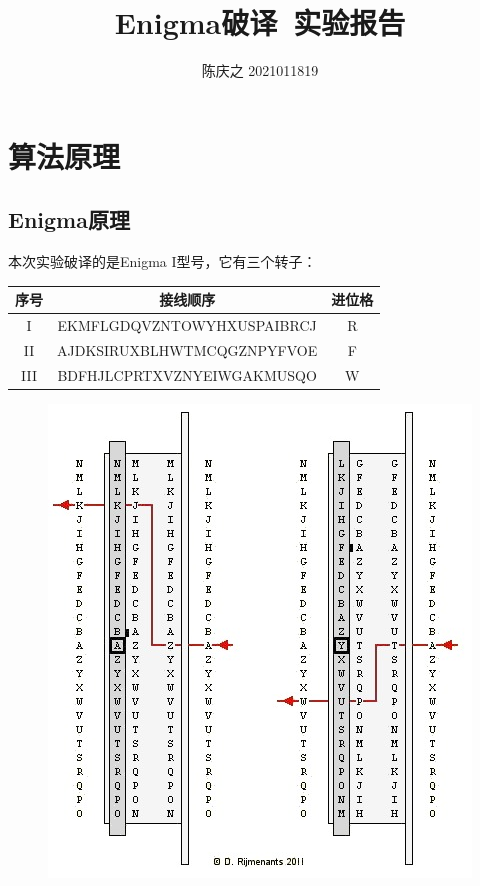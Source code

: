 \documentclass[a4paper,12pt]{article}
\title{Enigma破译\ 实验报告}
\author{陈庆之 2021011819}
\begin{document}
	
	\maketitle
	
	\section{算法原理}
	\subsection{Enigma原理}
	
	本次实验破译的是Enigma I型号，它有三个转子：
	
	\begin{center}
		\begin{tabular}{||c|c|c||}
			\hline 
			序号 & 接线顺序 & 进位格 \\
			\hline 
			I & EKMFLGDQVZNTOWYHXUSPAIBRCJ & R \\
			\hline 
			II & AJDKSIRUXBLHWTMCQGZNPYFVOE & F \\
			\hline 
			III & BDFHJLCPRTXVZNYEIWGAKMUSQO & W \\
			\hline
		\end{tabular}
	\end{center}

	
	\begin{figure}
		\centering
		\includegraphics[width=\textwidth]{rotorencodewithring}
	\end{figure}
	
\end{document}
